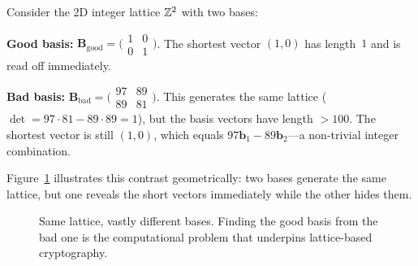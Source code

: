 \begin{example}
\label{ex:basis-comparison}
Consider the 2D integer lattice $\mathbb{Z}^2$ with two bases:

\noindent\textbf{Good basis:} $\mathbf{B}_{\mathrm{good}} = \bigl(\begin{smallmatrix} 1 & 0 \\ 0 & 1 \end{smallmatrix}\bigr)$.
The shortest vector $(1,0)$ has length~$1$ and is read off immediately.

\noindent\textbf{Bad basis:} $\mathbf{B}_{\mathrm{bad}} = \bigl(\begin{smallmatrix} 97 & 89 \\ 89 & 81 \end{smallmatrix}\bigr)$.
This generates the same lattice ($\det = 97\cdot 81 - 89\cdot 89 = 1$), but the basis vectors have length $> 100$.  The shortest vector is still $(1,0)$, which equals $97\mathbf{b}_1 - 89\mathbf{b}_2$---a non-trivial integer combination.
\end{example}

Figure~\ref{fig:ch06-good-bad-basis} illustrates this contrast geometrically: two bases generate the same lattice, but one reveals the short vectors immediately while the other hides them.

\begin{figure}[t]
\centering
{}
\caption{Same lattice, vastly different bases. Finding the good basis from the bad one is the computational problem that underpins lattice-based cryptography.}
\label{fig:ch06-good-bad-basis}
\end{figure}

